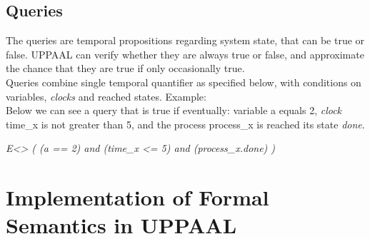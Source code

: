 \subsection{Queries \cite{semanticslUppaal}}
The queries are temporal propositions regarding system state, that can be true or false. UPPAAL can verify whether they are always true or false, and approximate the chance that they are true if only occasionally true.\\
Queries combine single temporal quantifier as specified below, with conditions on variables, \textit{clocks} and reached states. \queriesTable Example:\\
Below we can see a query that is true if eventually: variable a equals 2, \textit{clock} time_x is not greater than 5, and the process process_x is reached its state \textcolor{ColorUppaalState}{\textit{done}}.
\begin{center} \textit{ E<> ( (a == 2) and (time_x <= 5) and (process_x.done) )} \end{center}
\section{Implementation of Formal Semantics in UPPAAL}
